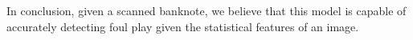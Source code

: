 \documentclass[14pt]{article}
\theoremstyle{plain}
\theoremstyle{definition}
\begin{document}
\noindent In conclusion, given a scanned banknote, we believe that this model is capable of accurately detecting foul play given the statistical features of an image.
 




\end{document}

